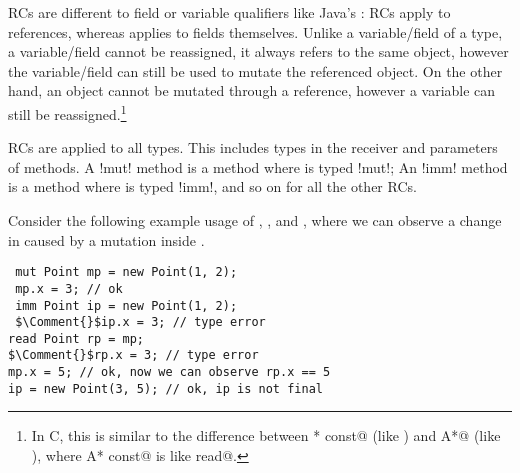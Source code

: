 RCs are different to field or variable qualifiers like Java's \Q@final@: RCs apply to references, whereas \Q@final@ applies to fields themselves. Unlike a variable/field of a \Q@read@ type, a \Q@final@ variable/field cannot be reassigned, it always refers to the same object, however the variable/field can still be used to mutate the referenced object.
On the other hand, an object cannot be mutated through a \Q@read@ reference, however a \Q@read@ variable can still be reassigned.\footnote{In C, this is similar to the difference between \Q@A* const@ (like \Q@final@) and \Q@const A*@ (like \Q@read@), where \Q@const A* const@ is like \Q@final read@.}

RCs are applied to all types. This includes types in the receiver and parameters of methods.
A \Q!mut! method is a method where \Q@this@ is typed \Q!mut!;
An \Q!imm! method is a method where \Q@this@ is typed \Q!imm!, and so on for all the other RCs.


Consider the following  example usage of \Q@mut@, \Q@imm@, and \Q@read@, where we can observe a change in \Q@rp@ caused by a mutation inside \Q@mp@.
\begin{lstlisting}
 mut Point mp = new Point(1, 2);
 mp.x = 3; // ok
 imm Point ip = new Point(1, 2);
 $\Comment{}$ip.x = 3; // type error
read Point rp = mp;
$\Comment{}$rp.x = 3; // type error
mp.x = 5; // ok, now we can observe rp.x == 5
ip = new Point(3, 5); // ok, ip is not final
\end{lstlisting} 

